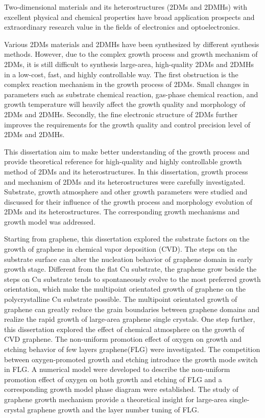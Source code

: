 \begin{englishabstract}
    Two-dimensional materials and its heterostructures (2DMs and 2DMHs) with excellent physical and chemical properties have broad application prospects and extraordinary research value in the fields of electronics and optoelectronics.

    Various 2DMs materials and 2DMHs have been synthesized by different synthesis methods. However, due to the complex growth process and growth  mechanism of 2DMs, it is still difficult to synthesis large-area, high-quality 2DMs and 2DMHs in a low-cost, fast, and highly controllable way. The first obstruction is the complex reaction mechanism in the growth process of 2DMs. Small changes in  parameters such as substrate chemical reaction, gas-phase chemical reaction, and growth temperature will heavily affect the growth quality and morphology of 2DMs and 2DMHs. Secondly, the fine electronic structure of 2DMs further improves the requirements for the growth quality and control precision level of 2DMs and 2DMHs.

    This dissertation aim to make better understanding of the growth process and provide theoretical reference for high-quality and highly controllable growth method of 2DMs and its heterostructures. In this dissertation, growth process and mechanism of 2DMs and its heterostructures were carefully investigated. Substrate, growth atmosphere and other growth parameters were studied and discussed for their influence of the growth process and morphology evolution of 2DMs and its heterostructures. The corresponding growth mechanisms and growth model was addressed.

    Starting from graphene, this dissertation explored the substrate factors on the growth of graphene in chemical vapor deposition (CVD). The steps on the substrate surface can alter the nucleation behavior of graphene domain in early growth stage. Different from the flat Cu substrate, the graphene grow beside the steps on Cu substrate tends to spontaneously evolve to the most preferred growth orientation, which make the multipoint orientated growth of graphene on the polycrystalline Cu substrate possible. The multipoint orientated growth of graphene can greatly reduce the grain boundaries between graphene domains and realize the rapid growth of large-area graphene single crystals. One step further, this dissertation explored the effect of chemical atmosphere on the growth of CVD graphene. The non-uniform promotion effect of oxygen on growth and etching behavior of few layers graphene(FLG) were investigated. The competition between oxygen-promoted growth and etching introduce the growth mode switch in FLG. A numerical model were developed to describe the non-uniform promotion effect of oxygen on both growth and etching of FLG and a corresponding growth model phase diagram were established. The study of graphene growth mechanism provide a theoretical insight for large-area single-crystal graphene growth and the layer number tuning of FLG.
    

\end{englishabstract}
